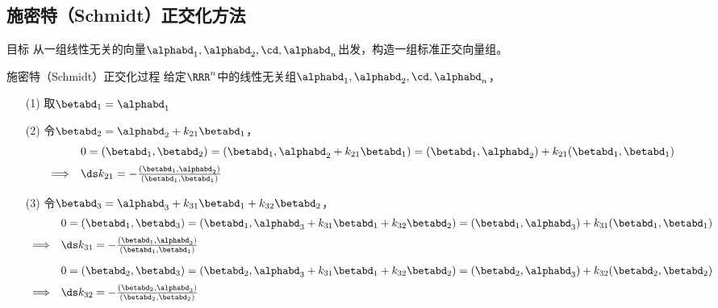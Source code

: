 \subsection{施密特（Schmidt）正交化方法}
\begin{frame}
  \begin{footnotesize}
    \begin{block}{目标}
      从一组线性无关的向量$\alphabd_1,\alphabd_2,\cd,\alphabd_n$出发，构造一组标准正交向量组。
    \end{block}
  \end{footnotesize}
\end{frame}


\begin{frame}
  \begin{footnotesize}
    \begin{block}{施密特（Schmidt）正交化过程}
      给定$\RRR^n$中的线性无关组$\alphabd_1,\alphabd_2,\cd,\alphabd_n$，
      \begin{itemize}
      \item[(1)] 取$\betabd_1=\alphabd_1$
      \item[(2)] 令$\betabd_2=\alphabd_2+k_{21}\betabd_1$，
        $$
        \begin{array}{rl}
          &0=(\betabd_1,\betabd_2)=(\betabd_1,\alphabd_2+k_{21}\betabd_1)=(\betabd_1,\alphabd_2)+k_{21}(\betabd_1,\betabd_1)\\[0.2cm]
          \Longrightarrow& \ds k_{21}=-\frac{(\betabd_1,\alphabd_2)}{(\betabd_1,\betabd_1)}
        \end{array}
        $$
      \item[(3)] 令$\betabd_3=\alphabd_3+k_{31}\betabd_1+k_{32}\betabd_2$，
        $$
        \begin{array}{rl}
          &0=(\betabd_1,\betabd_3)=(\betabd_1,\alphabd_3+k_{31}\betabd_1+k_{32}\betabd_2)=(\betabd_1,\alphabd_3)+k_{31}(\betabd_1,\betabd_1)\\[0.2cm]
          \Longrightarrow& \ds k_{31}=-\frac{(\betabd_1,\alphabd_3)}{(\betabd_1,\betabd_1)}\\[0.4cm]
          &0=(\betabd_2,\betabd_3)=(\betabd_2,\alphabd_3+k_{31}\betabd_1+k_{32}\betabd_2)=(\betabd_2,\alphabd_3)+k_{32}(\betabd_2,\betabd_2)\\[0.2cm]
          \Longrightarrow& \ds k_{32}=-\frac{(\betabd_2,\alphabd_3)}{(\betabd_2,\betabd_2)}
        \end{array}
        $$
      \end{itemize}
    \end{block}

  \end{footnotesize}
\end{frame}


